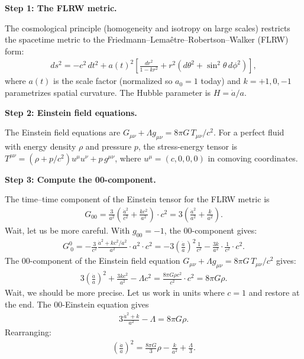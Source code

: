 \documentclass[11pt,openright]{book}
\begin{document}
\textbf{Step 1: The FLRW metric.}

The cosmological principle (homogeneity and isotropy on large scales) restricts the spacetime metric to the Friedmann--Lema\^etre--Robertson--Walker (FLRW) form:
\begin{align}
ds^2 = -c^2\,dt^2 + a(t)^2\left[\frac{dr^2}{1 - kr^2} + r^2(d\theta^2 + \sin^2\theta\,d\phi^2)\right],
\end{align}
where $a(t)$ is the scale factor (normalized so $a_0 = 1$ today) and $k = +1, 0, -1$ parametrizes spatial curvature. The Hubble parameter is $H = \dot{a}/a$.

\textbf{Step 2: Einstein field equations.}

The Einstein field equations are $G_{\mu\nu} + \Lambda g_{\mu\nu} = 8\pi G\,T_{\mu\nu}/c^2$. For a perfect fluid with energy density $\rho$ and pressure $p$, the stress-energy tensor is $T^{\mu\nu} = (\rho + p/c^2)u^\mu u^\nu + p\,g^{\mu\nu}$, where $u^\mu = (c, 0, 0, 0)$ in comoving coordinates.

\textbf{Step 3: Compute the 00-component.}

The time--time component of the Einstein tensor for the FLRW metric is
\begin{align}
G_{00} = \frac{3}{a^2}\left(\frac{\dot{a}^2}{c^2} + \frac{kc^2}{a^2}\right) \cdot c^2 = 3\left(\frac{\dot{a}^2}{a^2} + \frac{k}{a^2}\right).
\end{align}
Wait, let us be more careful. With $g_{00} = -1$, the 00-component gives:
\begin{align}
G^0_{\ 0} = -\frac{3}{c^2}\frac{\dot{a}^2 + kc^2/a^2}{a^2}\cdot a^2 \cdot c^2 = -3\left(\frac{\dot{a}}{a}\right)^2\frac{1}{c^2} - \frac{3k}{a^2}\cdot\frac{1}{c^2}\cdot c^2.
\end{align}
The $00$-component of the Einstein field equation $G_{\mu\nu} + \Lambda g_{\mu\nu} = 8\pi G\,T_{\mu\nu}/c^2$ gives:
\begin{align}
3\left(\frac{\dot{a}}{a}\right)^2 + \frac{3kc^2}{a^2} - \Lambda c^2 = \frac{8\pi G\rho c^2}{c^2} \cdot c^2 = 8\pi G\rho.
\end{align}
Wait, we should be more precise. Let us work in units where $c = 1$ and restore at the end. The 00-Einstein equation gives
\begin{align}
3\frac{\dot{a}^2 + k}{a^2} - \Lambda = 8\pi G\rho.
\end{align}
Rearranging:
\begin{align}
\left(\frac{\dot{a}}{a}\right)^2 = \frac{8\pi G}{3}\rho - \frac{k}{a^2} + \frac{\Lambda}{3}.
\end{align}
\end{document}
